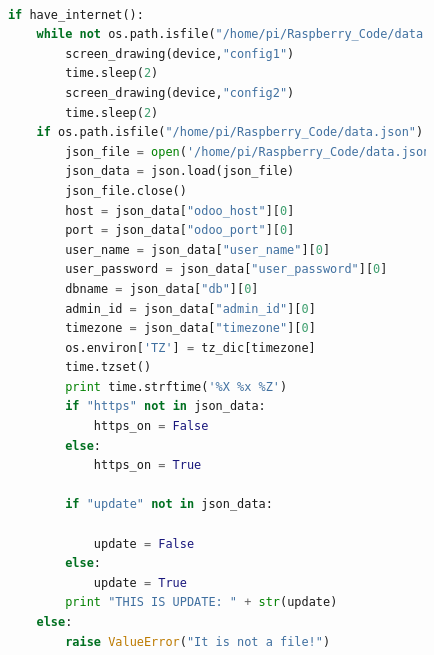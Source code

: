 \documentclass[12pt,a4paper,oneside]{article} %
\begin{document}
\begin{lstlisting}[language=python]

			if have_internet():
	            while not os.path.isfile("/home/pi/Raspberry_Code/data.json"):
	                screen_drawing(device,"config1")
	                time.sleep(2)
	                screen_drawing(device,"config2")
	                time.sleep(2)
	            if os.path.isfile("/home/pi/Raspberry_Code/data.json"):
	                json_file = open('/home/pi/Raspberry_Code/data.json')
	                json_data = json.load(json_file)
	                json_file.close()
	                host = json_data["odoo_host"][0]
	                port = json_data["odoo_port"][0]
	                user_name = json_data["user_name"][0]
	                user_password = json_data["user_password"][0]
	                dbname = json_data["db"][0]
	                admin_id = json_data["admin_id"][0]
	                timezone = json_data["timezone"][0]
	                os.environ['TZ'] = tz_dic[timezone]
	                time.tzset()
	                print time.strftime('%X %x %Z')
	                if "https" not in json_data:
	                    https_on = False
	                else:
	                    https_on = True
	
	                if "update" not in json_data:
	
	                    update = False
	                else:
	                    update = True
	                print "THIS IS UPDATE: " + str(update)
	            else:
	                raise ValueError("It is not a file!")

\end{lstlisting}

\newpage
\newpage
\newpage
\pagebreak


\end{document}
